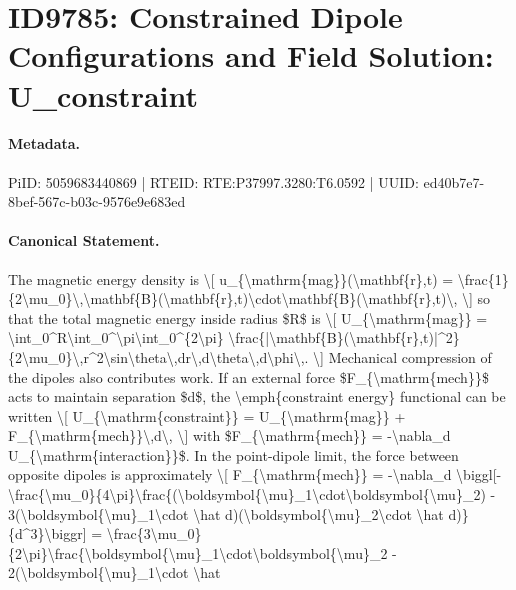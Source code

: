 \section*{ID9785: Constrained Dipole Configurations and Field Solution: U\_constraint}
\paragraph{Metadata.}
PiID: 5059683440869 | RTEID: RTE:P37997.3280:T6.0592 | UUID: ed40b7e7-8bef-567c-b03c-9576e9e683ed

\paragraph{Canonical Statement.}
The magnetic energy density is \textbackslash{}[ u\_\{\textbackslash{}mathrm\{mag\}\}(\textbackslash{}mathbf\{r\},t) = \textbackslash{}frac\{1\}\{2\textbackslash{}mu\_0\}\textbackslash{},\textbackslash{}mathbf\{B\}(\textbackslash{}mathbf\{r\},t)\textbackslash{}cdot\textbackslash{}mathbf\{B\}(\textbackslash{}mathbf\{r\},t)\textbackslash{}, \textbackslash{}] so that the total magnetic energy inside radius \$R\$ is \textbackslash{}[ U\_\{\textbackslash{}mathrm\{mag\}\} = \textbackslash{}int\_0\textasciicircum{}R\textbackslash{}int\_0\textasciicircum{}\textbackslash{}pi\textbackslash{}int\_0\textasciicircum{}\{2\textbackslash{}pi\} \textbackslash{}frac\{|\textbackslash{}mathbf\{B\}(\textbackslash{}mathbf\{r\},t)|\textasciicircum{}2\}\{2\textbackslash{}mu\_0\}\textbackslash{},r\textasciicircum{}2\textbackslash{}sin\textbackslash{}theta\textbackslash{},dr\textbackslash{},d\textbackslash{}theta\textbackslash{},d\textbackslash{}phi\textbackslash{},. \textbackslash{}] Mechanical compression of the dipoles also contributes work. If an external force \$F\_\{\textbackslash{}mathrm\{mech\}\}\$ acts to maintain separation \$d\$, the \textbackslash{}emph\{constraint energy\} functional can be written \textbackslash{}[ U\_\{\textbackslash{}mathrm\{constraint\}\} = U\_\{\textbackslash{}mathrm\{mag\}\} + F\_\{\textbackslash{}mathrm\{mech\}\}\textbackslash{},d\textbackslash{}, \textbackslash{}] with \$F\_\{\textbackslash{}mathrm\{mech\}\} = -\textbackslash{}nabla\_d U\_\{\textbackslash{}mathrm\{interaction\}\}\$. In the point-dipole limit, the force between opposite dipoles is approximately \textbackslash{}[ F\_\{\textbackslash{}mathrm\{mech\}\} = -\textbackslash{}nabla\_d \textbackslash{}biggl[-\textbackslash{}frac\{\textbackslash{}mu\_0\}\{4\textbackslash{}pi\}\textbackslash{}frac\{(\textbackslash{}boldsymbol\{\textbackslash{}mu\}\_1\textbackslash{}cdot\textbackslash{}boldsymbol\{\textbackslash{}mu\}\_2) - 3(\textbackslash{}boldsymbol\{\textbackslash{}mu\}\_1\textbackslash{}cdot \textbackslash{}hat d)(\textbackslash{}boldsymbol\{\textbackslash{}mu\}\_2\textbackslash{}cdot \textbackslash{}hat d)\}\{d\textasciicircum{}3\}\textbackslash{}biggr] = \textbackslash{}frac\{3\textbackslash{}mu\_0\}\{2\textbackslash{}pi\}\textbackslash{}frac\{\textbackslash{}boldsymbol\{\textbackslash{}mu\}\_1\textbackslash{}cdot\textbackslash{}boldsymbol\{\textbackslash{}mu\}\_2 - 2(\textbackslash{}boldsymbol\{\textbackslash{}mu\}\_1\textbackslash{}cdot \textbackslash{}hat 
